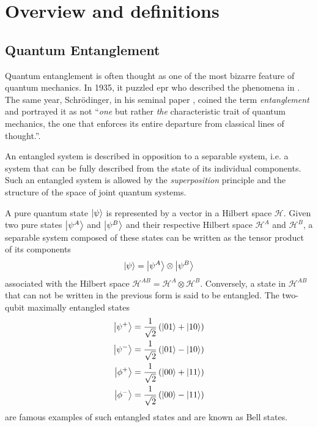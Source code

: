 \part{Overview and definitions}
\label{part:intro}

\chapter{Quantum Entanglement}
\label{section:entanglement}

Quantum entanglement is often thought as one of the most bizarre feature of quantum mechanics. 
In 1935, it puzzled \acrfull{epr} who described the phenomena in \cite{Einstein35}. 
The same year, Schrödinger, in his seminal paper \cite{Schrödinger35},
coined the term \textit{entanglement} and portrayed it as not \enquote{\textit{one} but rather \textit{the} characteristic trait of quantum mechanics, the one that enforces its entire departure from classical lines of thought.}.

An entangled system is described in opposition to a separable system, i.e. a system that can be fully described from the state of its individual components. 
Such an entangled system is allowed by the \textit{superposition} principle and the structure of the space of joint quantum systems. 

A pure quantum state $\ket{\psi}$ is represented by a vector in a Hilbert space $\mathscr{H}$.
Given two pure states $\ket{\psi^A}$ and $\ket{\psi^B}$ and their respective Hilbert space $\mathscr{H}^A$ and $\mathscr{H}^B$, a separable system composed of these states can be written as the tensor product of its components
\begin{equation}
	\ket{\psi} = \ket{\psi^A} \otimes \ket{\psi^B}
	\label{eq:separable_state}
\end{equation}
associated with the Hilbert space $\mathscr{H}^{AB}=\mathscr{H}^A\otimes\mathscr{H}^B$. 
Conversely, a state in $\mathscr{H}^{AB}$ that can not be written in the previous form is said to be entangled.
The two-qubit maximally entangled states
\begin{equation}
	\begin{split}
		\ket{\psi^+} &= \frac{1}{\sqrt{2}}\left(\ket{01}+\ket{10}\right) \\
		\ket{\psi^-} &= \frac{1}{\sqrt{2}}\left(\ket{01}-\ket{10}\right) \\
		\ket{\phi^+} &= \frac{1}{\sqrt{2}}\left(\ket{00}+\ket{11}\right) \\
		\ket{\phi^-} &= \frac{1}{\sqrt{2}}\left(\ket{00}-\ket{11}\right)
	\end{split}
	\label{eq:bell_states}
\end{equation}
are famous examples of such entangled states and are known as Bell states.

